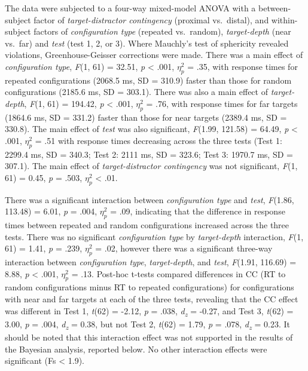 \documentclass[
  english,
  man,floatsintext]{apa7}
\begin{document}
The data were subjected to a four-way mixed-model ANOVA with a between-subject factor of \emph{target-distractor contingency} (proximal vs.~distal), and within-subject factors of \emph{configuration type} (repeated vs.~random), \emph{target-depth} (near vs.~far) and \emph{test} (test 1, 2, or 3). Where Mauchly's test of sphericity revealed violations, Greenhouse-Geisser corrections were made. There was a main effect of \emph{configuration type}, \emph{F}(1, 61) = 32.51, \emph{p} \textless{} .001, \(\eta^2_p\) = .35, with response times for repeated configurations (2068.5 ms, SD = 310.9) faster than those for random configurations (2185.6 ms, SD = 303.1). There was also a main effect of \emph{target-depth}, \emph{F}(1, 61) = 194.42, \emph{p} \textless{} .001, \(\eta^2_p\) = .76, with response times for far targets (1864.6 ms, SD = 331.2) faster than those for near targets (2389.4 ms, SD = 330.8). The main effect of \emph{test} was also significant, \emph{F}(1.99, 121.58) = 64.49, \emph{p} \textless{} .001, \(\eta^2_p\) = .51 with response times decreasing across the three tests (Test 1: 2299.4 ms, SD = 340.3; Test 2: 2111 ms, SD = 323.6; Test 3: 1970.7 ms, SD = 307.1). The main effect of \emph{target-distractor contingency} was not significant, \emph{F}(1, 61) = 0.45, \emph{p} = .503, \(\eta^2_p\) \textless{} .01.

There was a significant interaction between \emph{configuration type} and \emph{test}, \emph{F}(1.86, 113.48) = 6.01, \emph{p} = .004, \(\eta^2_p\) = .09, indicating that the difference in response times between repeated and random configurations increased across the three tests. There was no significant \emph{configuration type} by \emph{target-depth} interaction, \emph{F}(1, 61) = 1.41, \emph{p} = .239, \(\eta^2_p\) = .02, however there was a significant three-way interaction between \emph{configuration type}, \emph{target-depth}, and \emph{test}, \emph{F}(1.91, 116.69) = 8.88, \emph{p} \textless{} .001, \(\eta^2_p\) = .13. Post-hoc t-tests compared differences in CC (RT to random configurations minus RT to repeated configurations) for configurations with near and far targets at each of the three tests, revealing that the CC effect was different in Test 1, \emph{t}(62) = -2.12, \emph{p} = .038, \emph{d\textsubscript{z}} = -0.27, and Test 3, \emph{t}(62) = 3.00, \emph{p} = .004, \emph{d\textsubscript{z}} = 0.38, but not Test 2, \emph{t}(62) = 1.79, \emph{p} = .078, \emph{d\textsubscript{z}} = 0.23. It should be noted that this interaction effect was not supported in the results of the Bayesian analysis, reported below. No other interaction effects were significant (Fs \textless{} 1.9).
\end{document}
